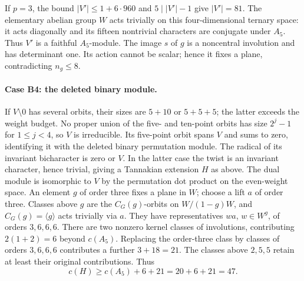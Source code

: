 \documentclass[11pt]{amsart}
\numberwithin{equation}{section}
\theoremstyle{definition}
\theoremstyle{plain}
\begin{document}
If $p=3$, the bound $|V'|\le1+6\cdot960$ and $5\mid |V'|-1$
give $|V'|=81$. The elementary abelian group $W$ acts trivially
on this four-dimensional ternary space: it acts diagonally and
its fifteen nontrivial characters are conjugate under $A_5$.
Thus $V'$ is a faithful $A_5$-module. The image $s$ of $g$ is a
noncentral involution and has determinant one. Its action cannot
be scalar; hence it fixes a plane, contradicting $n_g\le8$.

\paragraph{Case B4: the deleted binary module.}\label{ext:neutral-B4}
If $V\setminus0$ has several orbits, their sizes are $5+10$ or
$5+5+5$; the latter exceeds the weight budget. No proper union of
the five- and ten-point orbits has size $2^j-1$ for $1\le j<4$,
so $V$ is irreducible. Its five-point orbit spans $V$ and sums to
zero, identifying it with the deleted binary permutation module.
The radical of its invariant bicharacter is zero or $V$. In the latter case the twist is an invariant character,
hence trivial, giving a Tannakian extension $H$ as above. The dual
module is isomorphic to $V$ by the permutation dot product on the
even-weight space. An element $g$ of order three fixes a plane in $W$;
choose a lift $a$ of order three. Classes above $g$ are the
$C_G(g)$-orbits on $W/(1-g)W$, and $C_G(g)=\langle g\rangle$ acts
trivially via $a$. They have representatives $wa$, $w\in W^g$,
of orders $3,6,6,6$. There are two nonzero kernel classes of involutions, contributing
$2(1+2)=6$ beyond $c(A_5)$. Replacing the order-three class by
classes of orders $3,6,6,6$ contributes a further $3+18=21$.
The classes above $2,5,5$ retain at least their original contributions.
Thus
\[
 c(H)\ge c(A_5)+6+21=20+6+21=47.
\]
\end{document}
